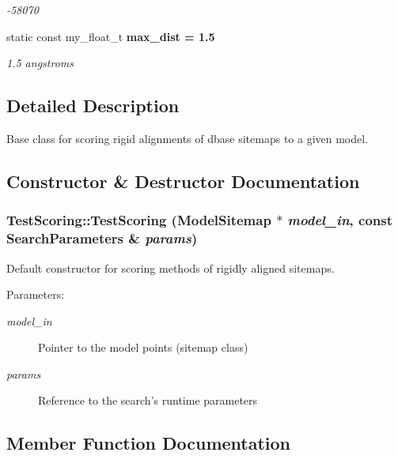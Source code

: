 \begin{CompactItemize}
\begin{CompactList}\small\item\em -58070 \item\end{CompactList}\item 
static const my\_\-float\_\-t \bf{max\_\-dist} = 1.5\label{classSimSite3D_1_1TestScoring_46212ce7b93b0912702739bfd3efe04f}

\begin{CompactList}\small\item\em 1.5 angstroms \item\end{CompactList}\end{CompactItemize}


\subsection{Detailed Description}
Base class for scoring rigid alignments of dbase sitemaps to a given model. 



\subsection{Constructor \& Destructor Documentation}
\subsubsection{\setlength{\rightskip}{0pt plus 5cm}Test\-Scoring::Test\-Scoring (\bf{Model\-Sitemap} $\ast$ {\em model\_\-in}, const \bf{Search\-Parameters} \& {\em params})}\label{classSimSite3D_1_1TestScoring_30cc41f637641ce6dd0c225594e17e15}


Default constructor for scoring methods of rigidly aligned sitemaps. 

\begin{Desc}
\item[Parameters:]
\begin{description}
\item[{\em model\_\-in}]Pointer to the model points (sitemap class) \item[{\em params}]Reference to the search's runtime parameters \end{description}
\end{Desc}


\subsection{Member Function Documentation}
